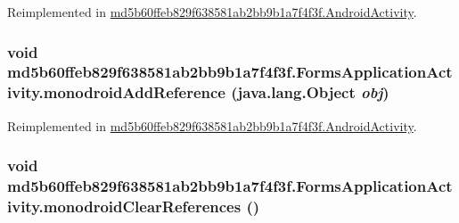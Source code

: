 Reimplemented in \hyperlink{classmd5b60ffeb829f638581ab2bb9b1a7f4f3f_1_1_android_activity_ce19d2cda349014c97ed5589f26495f0}{md5b60ffeb829f638581ab2bb9b1a7f4f3f.AndroidActivity}.\hypertarget{classmd5b60ffeb829f638581ab2bb9b1a7f4f3f_1_1_forms_application_activity_2c4010f783599213a274f63e6d5fd3d3}{
\subsubsection[{monodroidAddReference}]{\setlength{\rightskip}{0pt plus 5cm}void md5b60ffeb829f638581ab2bb9b1a7f4f3f.FormsApplicationActivity.monodroidAddReference (java.lang.Object {\em obj})}}
\label{classmd5b60ffeb829f638581ab2bb9b1a7f4f3f_1_1_forms_application_activity_2c4010f783599213a274f63e6d5fd3d3}




Reimplemented in \hyperlink{classmd5b60ffeb829f638581ab2bb9b1a7f4f3f_1_1_android_activity_6b88d0d1ad864a4599f8a26deaacb459}{md5b60ffeb829f638581ab2bb9b1a7f4f3f.AndroidActivity}.\hypertarget{classmd5b60ffeb829f638581ab2bb9b1a7f4f3f_1_1_forms_application_activity_837c4f559a7030eedd33be67a0272eaf}{
\subsubsection[{monodroidClearReferences}]{\setlength{\rightskip}{0pt plus 5cm}void md5b60ffeb829f638581ab2bb9b1a7f4f3f.FormsApplicationActivity.monodroidClearReferences ()}}
\label{classmd5b60ffeb829f638581ab2bb9b1a7f4f3f_1_1_forms_application_activity_837c4f559a7030eedd33be67a0272eaf}




